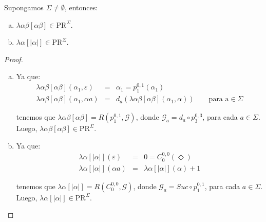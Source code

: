   \begin{lemma}
    \PN Supongamos $\Sigma \neq \emptyset$, entonces:

    \begin{enumerate}[a)]
      \item $\lambda \alpha \beta \left[\alpha\beta\right] \in \mathrm{PR}^{\Sigma}$.
      \item $\lambda \alpha \left[\lvert\alpha \rvert\right] \in \mathrm{PR}^{\Sigma}$.
    \end{enumerate}
  \end{lemma}
  \begin{proof}
    \begin{enumerate}[a)]
      \item Ya que:
        \begin{eqnarray*}
          \lambda \alpha\beta \left[\alpha \beta\right](\alpha_{1}, \varepsilon) &=& \alpha_{1} = p_{1}^{0,1}
            (\alpha_{1}) \\
          \lambda \alpha\beta \left[\alpha \beta\right](\alpha_{1}, \alpha a) &=& d_{a}(\lambda \alpha\beta \left[\alpha
            \beta\right](\alpha_{1}, \alpha)) \qquad \text{para a} \in \Sigma
        \end{eqnarray*}

        \PN tenemos que $\lambda \alpha\beta \left[\alpha \beta\right] = R(p_{1}^{0, 1}, \mathcal{G})$, donde
        $\mathcal{G}_{a} = d_{a} \circ p_{3}^{0,3}$, para cada $a \in \Sigma$.
        \PN Luego, $\lambda \alpha\beta \left[\alpha\beta\right] \in \mathrm{PR}^{\Sigma}$.

      \item Ya que:
        \begin{eqnarray*}
          \lambda \alpha \left[\lvert\alpha \rvert\right](\varepsilon) &=& 0 = C_{0}^{0,0}(\Diamond) \\
          \lambda \alpha \left[\lvert\alpha \rvert\right](\alpha a) &=& \lambda \alpha \left[\lvert\alpha \rvert\right]
            (\alpha) + 1
        \end{eqnarray*}

        \PN tenemos que $\lambda \alpha \left[\lvert\alpha \rvert\right] = R(C_{0}^{0, 0}, \mathcal{G})$, donde
        $\mathcal{G}_{a} = Suc \circ p_{1}^{0,1}$, para cada $a \in \Sigma$.
        \PN Luego, $\lambda \alpha \left[\lvert\alpha \rvert\right] \in \mathrm{PR}^{\Sigma}$.
    \end{enumerate}
  \end{proof}


